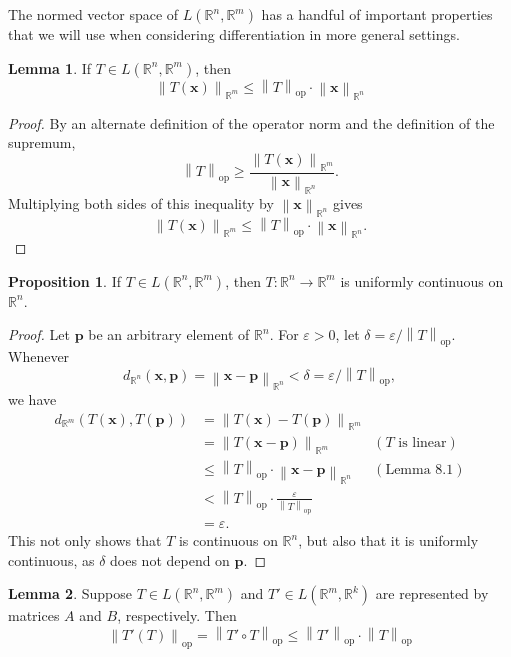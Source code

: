 \documentclass{article}
\newcommand{\R}{\mathbb{R}}
\newcommand{\x}{\mathbf{x}}
\newcommand{\norm}[1]{\left\lVert#1\right\rVert}
\newcommand{\normop}[1]{\left\lVert#1\right\rVert_\text{op}}
\theoremstyle{definition}
\newtheorem{proposition}{Proposition}[section]
\newtheorem{lemma}{Lemma}[section]
\begin{document}
The normed vector space of $ L(\R^n,\R^m) $ has a handful of important properties that we will use when considering differentiation in more general settings. 
\begin{lemma}
	If $ T\in L(\R^n,\R^m) $, then $$ \norm{T(\x)}_{\R^m}\le \normop{T}\cdot\norm{\x}_{\R^n} $$
\end{lemma}
\begin{proof}
	By an alternate definition of the operator norm and the definition of the supremum, 
	$$\norm{T}_\text{op} \ge  \frac{\norm{T(\x)}_{\R^m}}{\norm{\x}_{\R^n}}.$$
	Multiplying both sides of this inequality by $ \norm{\x}_{\R^n} $ gives 
	$$  \norm{T(\x)}_{\R^m}\le \normop{T}\cdot\norm{\x}_{\R^n} .$$ 
\end{proof}
\begin{proposition}
 If $ T\in L(\R^n,\R^m) $, then $ T:\R^n\to\R^m $ is uniformly continuous on $ \R^n $.
\end{proposition}
\begin{proof}
	Let $ \mathbf p $ be an arbitrary element of $ \R^n $. For $ \varepsilon > 0 $, let $ \delta = \varepsilon/\normop{T} $. Whenever $$ d_{\R^n}(\x, \mathbf p) = \norm{\x - \mathbf p}_{\R^n} < \delta = \varepsilon/\normop{T},$$ we have 
	\begin{align*}
	d_{\R^m}(T(\x), T(\mathbf p)) &= \norm{T(\x) - T(\mathbf p) }_{\R^m} \\ &= \norm{T(\x - \mathbf p) }_{\R^m}	&(T \text{ is linear})\\ & \le \normop{T}\cdot \norm{\x - \mathbf p}_{\R^n} & (\text{Lemma 8.1})\\
	& < \normop{T}\cdot\frac{\varepsilon}{\normop{T}}\\
	& = \varepsilon.
	\end{align*}
This not only shows that $ T $ is continuous on $ \R^n $, but also that it is uniformly continuous, as $ \delta $ does not depend on $ \mathbf p $. 
\end{proof}
\begin{lemma}
	Suppose $ T\in L(\R^n,\R^m) $ and $ T'\in L(\R^m,\R^k) $ are represented by matrices $ A $ and $ B $, respectively. Then $$ \normop{T'(T)} = \normop{T'\circ T} \le \normop{T'}\cdot\normop{T}$$
\end{lemma}
\end{document}
